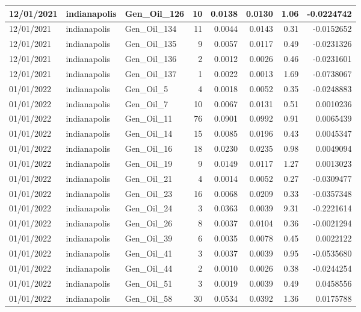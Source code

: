 \documentclass[
  letterpaper,
  DIV=11,
  numbers=noendperiod]{scrartcl}
\begin{document}
\begin{tabular}{l|l|l|r|r|r|r|r}
\hline
12/01/2021 & indianapolis & Gen\_Oil\_126 & 10 & 0.0138 & 0.0130 & 1.06 & -0.0224742\\
\hline
12/01/2021 & indianapolis & Gen\_Oil\_134 & 11 & 0.0044 & 0.0143 & 0.31 & -0.0152652\\
\hline
12/01/2021 & indianapolis & Gen\_Oil\_135 & 9 & 0.0057 & 0.0117 & 0.49 & -0.0231326\\
\hline
12/01/2021 & indianapolis & Gen\_Oil\_136 & 2 & 0.0012 & 0.0026 & 0.46 & -0.0231601\\
\hline
12/01/2021 & indianapolis & Gen\_Oil\_137 & 1 & 0.0022 & 0.0013 & 1.69 & -0.0738067\\
\hline
01/01/2022 & indianapolis & Gen\_Oil\_5 & 4 & 0.0018 & 0.0052 & 0.35 & -0.0248883\\
\hline
01/01/2022 & indianapolis & Gen\_Oil\_7 & 10 & 0.0067 & 0.0131 & 0.51 & 0.0010236\\
\hline
01/01/2022 & indianapolis & Gen\_Oil\_11 & 76 & 0.0901 & 0.0992 & 0.91 & 0.0065439\\
\hline
01/01/2022 & indianapolis & Gen\_Oil\_14 & 15 & 0.0085 & 0.0196 & 0.43 & 0.0045347\\
\hline
01/01/2022 & indianapolis & Gen\_Oil\_16 & 18 & 0.0230 & 0.0235 & 0.98 & 0.0049094\\
\hline
01/01/2022 & indianapolis & Gen\_Oil\_19 & 9 & 0.0149 & 0.0117 & 1.27 & 0.0013023\\
\hline
01/01/2022 & indianapolis & Gen\_Oil\_21 & 4 & 0.0014 & 0.0052 & 0.27 & -0.0309477\\
\hline
01/01/2022 & indianapolis & Gen\_Oil\_23 & 16 & 0.0068 & 0.0209 & 0.33 & -0.0357348\\
\hline
01/01/2022 & indianapolis & Gen\_Oil\_24 & 3 & 0.0363 & 0.0039 & 9.31 & -0.2221614\\
\hline
01/01/2022 & indianapolis & Gen\_Oil\_26 & 8 & 0.0037 & 0.0104 & 0.36 & -0.0021294\\
\hline
01/01/2022 & indianapolis & Gen\_Oil\_39 & 6 & 0.0035 & 0.0078 & 0.45 & 0.0022122\\
\hline
01/01/2022 & indianapolis & Gen\_Oil\_41 & 3 & 0.0037 & 0.0039 & 0.95 & -0.0535680\\
\hline
01/01/2022 & indianapolis & Gen\_Oil\_44 & 2 & 0.0010 & 0.0026 & 0.38 & -0.0244254\\
\hline
01/01/2022 & indianapolis & Gen\_Oil\_51 & 3 & 0.0019 & 0.0039 & 0.49 & 0.0458556\\
\hline
01/01/2022 & indianapolis & Gen\_Oil\_58 & 30 & 0.0534 & 0.0392 & 1.36 & 0.0175788\\

\end{tabular}
\end{document}
